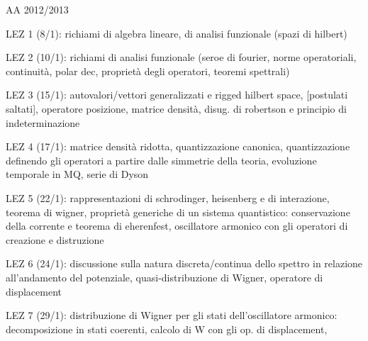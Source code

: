 AA 2012/2013


LEZ 1 (8/1):  richiami di algebra lineare, di analisi funzionale (spazi di hilbert)

LEZ 2 (10/1): richiami di analisi funzionale (seroe di fourier, norme operatoriali, continuità, polar dec, proprietà degli operatori, teoremi spettrali)

LEZ 3 (15/1): autovalori/vettori generalizzati e rigged hilbert space, [postulati saltati], operatore posizione, matrice densità, disug. di robertson e principio di indeterminazione

LEZ 4 (17/1): matrice densità ridotta, quantizzazione canonica, quantizzazione definendo gli operatori a partire dalle simmetrie della teoria, evoluzione temporale in MQ, serie di Dyson

LEZ 5 (22/1): rappresentazioni di schrodinger, heisenberg e di interazione, teorema di wigner, proprietà generiche di un sistema quantistico: conservazione della corrente e teorema di eherenfest, oscillatore armonico con gli operatori di creazione e distruzione

LEZ 6 (24/1): discussione sulla natura discreta/continua dello spettro in relazione all'andamento del potenziale, quasi-distribuzione di Wigner, operatore di displacement

LEZ 7 (29/1): distribuzione di Wigner per gli stati dell'oscillatore armonico: decomposizione in stati coerenti, calcolo di W con gli op. di displacement, 
